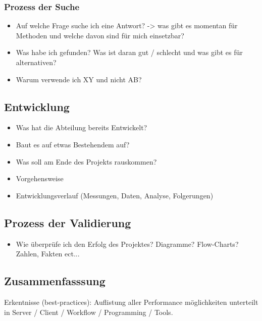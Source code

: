 \documentclass[a4paper,11pt,singlespacing]{article}
\begin{document}
			\subsubsection{Prozess der Suche}
			\label{sub:prozess_der_suche}
				\begin{itemize}
					\item Auf welche Frage suche ich eine Antwort? -> was gibt es momentan für Methoden und welche davon sind für mich einsetzbar?
					\item  Was habe ich gefunden? Was ist daran gut / schlecht und was gibt es für alternativen?
					\item Warum verwende ich XY und nicht AB?
				\end{itemize}


	\subsection{Entwicklung}
	\label{sub:entwicklung}
		\begin{itemize}
			\item Was hat die Abteilung bereits Entwickelt?
			\item Baut es auf etwas Bestehendem auf?
			\item Was soll am Ende des Projekts rauskommen?
			\item Vorgehensweise
			\item Entwicklungsverlauf (Messungen, Daten, Analyse, Folgerungen)
		\end{itemize}


	\subsection{Prozess der Validierung}
	\label{sub:prozess_der_validierung}
		\begin{itemize}
			\item Wie überprüfe ich den Erfolg des Projektes? Diagramme? Flow-Charts? Zahlen, Fakten ect...
		\end{itemize}


	\subsection{Zusammenfasssung}
	\label{sub:zusammenfasssung}
		Erkentnisse (best-practices): Auflistung aller Performance möglichkeiten unterteilt in Server / Client / Workflow / Programming / Tools.\\
\end{document}
